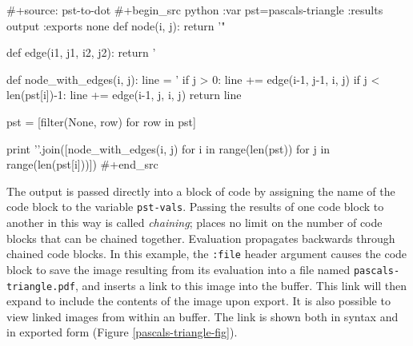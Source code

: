 \documentclass[article,shortnames]{jss}
\begin{document}
\begin{Code}
#+source: pst-to-dot
#+begin_src python :var pst=pascals-triangle :results output :exports none
  def node(i, j):
        return '"%

  def edge(i1, j1, i2, j2):
        return '%

  def node_with_edges(i, j):
        line = '%
        if j > 0:
              line += edge(i-1, j-1, i, j)
        if j < len(pst[i])-1:
              line += edge(i-1, j, i, j)
        return line

  pst = [filter(None, row) for row in pst]

  print '\n'.join([node_with_edges(i, j)
                   for i in range(len(pst))
                   for j in range(len(pst[i]))])
#+end_src
\end{Code}






The output is passed directly into a block of  code by assigning
the name of the  code block to the variable \texttt{pst-vals}.  Passing
the results of one code block to another in this way is called
\emph{chaining};  places no limit on the number of code blocks that
can be chained together.  Evaluation propagates backwards through
chained code blocks.  In this example, the \texttt{:file} header argument
causes the code block to save the image resulting from its evaluation
into a file named \texttt{pascals-triangle.pdf}, and inserts a link to this
image into the  buffer.  This link will then expand to include
the contents of the image upon export.  It is also possible to view
linked images from within an  buffer.  The link is shown both
in  syntax and in exported form (Figure
\ref{pascals-triangle-fig}).


\end{document}

